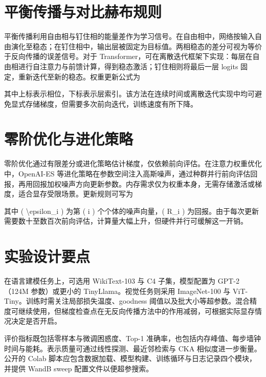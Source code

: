\chapter{平衡传播与对比赫布规则}
平衡传播利用自由相与钉住相的能量差作为学习信号。在自由相中，网络按输入自由演化至稳态；在钉住相中，输出层被固定为目标值。两相稳态的差分可视为等价于反向传播的误差信号。对于 Transformer，可在离散迭代框架下实现：每层在自由相进行自注意力与前馈计算，得到稳态激活；钉住相则将最后一层 logits 固定，重新迭代至新的稳态。权重更新公式为\par
[
\textbackslash{}Delta W\_{}l \textbackslash{}propto \textbackslash{}frac\{{}1\}{}\{{}N\}{}\textbackslash{}sum\_{}\{{}n=1\}{}\^{}\{{}N\}{}\textbackslash{}left( h\_{}l\^{}\{{}\textbackslash{}text\{{}clamped\}{},(n)\}{} - h\_{}l\^{}\{{}\textbackslash{}text\{{}free\}{},(n)\}{} \textbackslash{}right) \textbackslash{}left( h\_{}\{{}l-1\}{}\^{}\{{}\textbackslash{}text\{{}free\}{},(n)\}{} \textbackslash{}right)\^{}\textbackslash{}top
]\par
其中上标表示相位，下标表示层索引。该方法在连续时间或离散迭代实现中均可避免显式存储梯度，但需要多次前向迭代，训练速度有所下降。\par
\chapter{零阶优化与进化策略}
零阶优化通过有限差分或进化策略估计梯度，仅依赖前向评估。在注意力权重优化中，OpenAI-ES 等进化策略在参数空间注入高斯噪声，通过种群并行前向评估回报，再用回报加权噪声方向更新参数。内存需求仅为权重本身，无需存储激活或梯度，适合显存受限场景。更新规则可写为\par
[
\textbackslash{}theta \textbackslash{}leftarrow \textbackslash{}theta + \textbackslash{}alpha \textbackslash{}frac\{{}1\}{}\{{}N\}{}\textbackslash{}sum\_{}\{{}i=1\}{}\^{}\{{}N\}{} R\_{}i \textbackslash{}epsilon\_{}i
]\par
其中 ( \textbackslash{}epsilon\_{}i ) 为第 ( i ) 个个体的噪声向量，( R\_{}i ) 为回报。由于每次更新需要数十至数百次前向评估，计算量大幅上升，但硬件并行可缓解这一开销。\par
\chapter{实验设计要点}
在语言建模任务上，可选用 WikiText-103 与 C4 子集，模型配置为 GPT-2（124M 参数）或更小的 TinyLlama。视觉任务则采用 ImageNet-100 与 ViT-Tiny。训练时需关注局部损失温度、goodness 阈值以及批大小等超参数。混合精度可继续使用，但梯度检查点在无反向传播方法中的作用减弱，可根据实际显存情况决定是否开启。\par
评价指标既包括零样本与微调困惑度、Top-1 准确率，也包括内存峰值、每步墙钟时间与能耗。表示质量可通过线性探测、最近邻检索与 CKA 相似度进一步衡量。公开的 Colab 脚本应包含数据加载、模型构建、训练循环与日志记录四个模块，并提供 WandB sweep 配置文件以便超参搜索。\par
